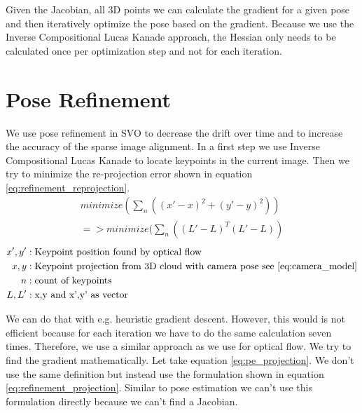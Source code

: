 \documentclass[11pt,a4paper,titlepage,oneside]{report}
\begin{document}
Given the Jacobian, all 3D points we can calculate the gradient for a given pose and then iteratively optimize the pose based on the gradient. Because we use the Inverse Compositional Lucas Kanade approach, the Hessian only needs to be calculated once per optimization step and not for each iteration.

\chapter{Pose Refinement}\label{ch:pose_refinement}

We use pose refinement in SVO to decrease the drift over time and to increase the accuracy of the sparse image alignment. In a first step we use Inverse Compositional Lucas Kanade to locate keypoints in the current image. Then we try to minimize the re-projection error shown in equation \ref{eq:refinement_reprojection}.
\begin{equation}\label{eq:refinement_reprojection}
  \begin{gathered}
    minimize(\sum_n ((x'-x)^2+(y'-y)^2))\\
    =>minimize(\sum_n ((L'-L)^T(L'-L))
  \end{gathered}
\end{equation}
\begin{align*}
  x',y'   &: \text{Keypoint position found by optical flow}\\
  x,y     &: \text{Keypoint projection from 3D cloud with camera pose see \ref{eq:camera_model}}\\
  n       &: \text{count of keypoints}\\
  L,L'    &: \text{x,y and x',y' as vector}
\end{align*}

We can do that with e.g. heuristic gradient descent. However, this would is not efficient because for each iteration we have to do the same calculation seven times. Therefore, we use a similar approach as we use for optical flow. We try to find the gradient mathematically. Let take equation \ref{eq:pe_projection}. We don't use the same definition but instead use the formulation shown in equation \ref{eq:refinement_projection}. Similar to pose estimation we can't use this formulation directly because we can't find a Jacobian.
\end{document}
